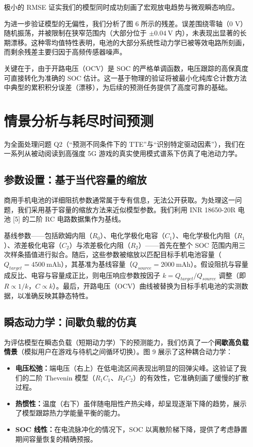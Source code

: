 \documentclass[11pt,a4paper]{ctexart}
\begin{document}
极小的 RMSE 证实我们的模型同时成功刻画了宏观放电趋势与微观瞬态响应。

为进一步验证模型的无偏性，我们分析了图 6 所示的残差。误差围绕零轴（0 V）随机振荡，并被限制在狭窄范围内（大部分位于 $\pm 0.04\ \mathrm{V}$ 内），未表现出显著的长期漂移。这种零均值特性表明，电池的大部分系统性动力学已被等效电路所刻画，而剩余残差主要归因于高频传感器噪声。

关键在于，由于开路电压（OCV）是 SOC 的严格单调函数，电压跟踪的高保真度可直接转化为准确的 SOC 估计。这一基于物理的验证将被最小化纯库仑计数方法中典型的累积积分误差（漂移），为后续的预测任务提供了高度可靠的基础。

\section{情景分析与耗尽时间预测}

为全面处理问题 Q2（“预测不同条件下的 TTE”与“识别特定驱动因素”），我们在一系列从被动阅读到高强度 5G 游戏的真实使用模式谱系下仿真了电池动力学。

\subsection{参数设置：基于当代容量的缩放}

商用手机电池的详细阻抗参数通常属于专有信息，无法公开获取。为处理这一问题，我们采用基于容量的缩放方法来近似模型参数。我们利用 INR 18650-20R 电池 [5] 的二阶 RC 电路数据集作为基线。

基线参数——包括欧姆内阻（$R_0$）、电化学极化电容（$C_1$）、电化学极化内阻（$R_1$）、浓差极化电容（$C_2$）与浓差极化内阻（$R_2$）——首先在整个 SOC 范围内用三次样条插值进行拟合。随后，这些参数被缩放以匹配目标手机电池容量（$Q_{target}=4500\ \mathrm{mAh}$），其基准为基线容量（$Q_{source}=2000\ \mathrm{mAh}$）。假设阻抗与容量成反比、电容与容量成正比，则电压响应参数按因子 $k=Q_{target}/Q_{source}$ 调整（即 $R\propto 1/k$，$C\propto k$）。最后，开路电压（OCV）曲线被替换为目标手机电池的实测数据，以准确反映其静态特性。

\subsection{瞬态动力学：间歇负载的仿真}

为评估模型在瞬态负载（短期动力学）下的预测能力，我们仿真了一个\textbf{间歇高负载情景}（模拟用户在游戏与待机之间循环切换）。图 9 展示了这种耦合动力学：

\begin{itemize}[leftmargin=1.6em,itemsep=0.3em]
\item \textbf{电压松弛：}端电压（右上）在低电流区间表现出明显的回弹尖峰。这验证了我们的二阶 Thevenin 模型（$R_1C_1$、$R_2C_2$）的有效性，它准确刻画了缓慢的扩散过程。
\item \textbf{热惯性：}温度（右下）虽伴随电阻性产热尖峰，却呈现逐渐下降的趋势，展示了模型跟踪热力学能量平衡的能力。
\item \textbf{SOC 线性：}在电流脉冲化的情况下，SOC 以离散阶梯下降，提供了考虑静置期间容量恢复的精确预报。
\end{itemize}
\end{document}
